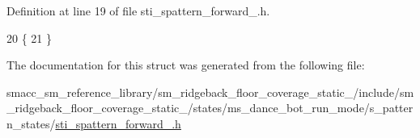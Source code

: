 Definition at line 19 of file sti\+\_\+spattern\+\_\+forward\+\_.\+h.


\begin{DoxyCode}
20   \{
21   \}
\end{DoxyCode}


The documentation for this struct was generated from the following file\+:\begin{DoxyCompactItemize}
\item 
smacc\+\_\+sm\+\_\+reference\+\_\+library/sm\+\_\+ridgeback\+\_\+floor\+\_\+coverage\+\_\+static\+\_/include/sm\+\_\+ridgeback\+\_\+floor\+\_\+coverage\+\_\+static\+\_/states/ms\+\_\+dance\+\_\+bot\+\_\+run\+\_\+mode/s\+\_\+pattern\+\_\+states/\hyperlink{sm__ridgeback__floor__coverage__static__1_2include_2sm__ridgeback__floor__coverage__static__1_2se3456bb484bc1570484d63dbe1c84051}{sti\+\_\+spattern\+\_\+forward\+\_.\+h}\end{DoxyCompactItemize}
